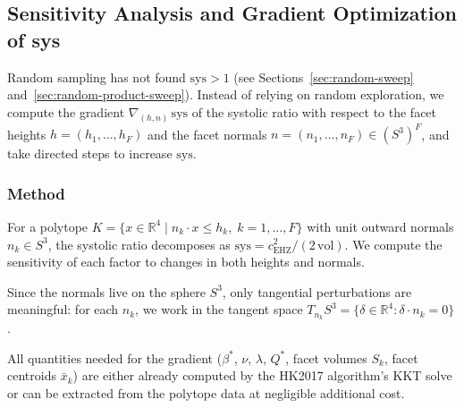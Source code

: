 %
%
%

\subsection{Sensitivity Analysis and Gradient Optimization of sys}
\label{sec:sys-optimization}

Random sampling has not found $\mathrm{sys} > 1$ (see
Sections~\ref{sec:random-sweep} and~\ref{sec:random-product-sweep}).
Instead of relying on random exploration, we compute the gradient
$\nabla_{(h,n)}\,\mathrm{sys}$ of the systolic ratio with respect to
the facet heights $h = (h_1,\dots,h_F)$ and the facet normals
$n = (n_1,\dots,n_F) \in (S^3)^F$, and take directed steps to increase
$\mathrm{sys}$.

\subsubsection*{Method}

For a polytope $K = \{x \in \mathbb{R}^4 \mid n_k \cdot x \le h_k,\; k=1,\dots,F\}$
with unit outward normals $n_k \in S^3$, the systolic ratio decomposes as
$\mathrm{sys} = c_{\mathrm{EHZ}}^2 / (2\,\mathrm{vol})$.
We compute the sensitivity of each factor to changes in both heights and normals.

Since the normals live on the sphere $S^3$, only tangential perturbations
are meaningful: for each $n_k$, we work in the tangent space
$T_{n_k}S^3 = \{\delta \in \mathbb{R}^4 : \delta \cdot n_k = 0\}$.

All quantities needed for the gradient ($\beta^*$, $\nu$, $\lambda$, $Q^*$,
facet volumes $S_k$, facet centroids $\bar{x}_k$) are either already computed
by the HK2017 algorithm's KKT solve or can be extracted from the polytope data
at negligible additional cost.

